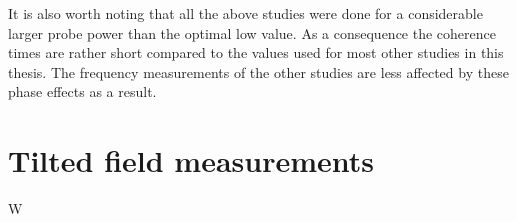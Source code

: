 It is also worth noting that all the above studies were done for a
considerable larger probe power than the optimal low value.  As a
consequence the coherence times are rather short compared to the
values used for most other studies in this thesis.  The frequency
measurements of the other studies are less affected by these phase
effects as a result.


\section{Tilted field measurements} 
\label{sec:tilted-results}


%


W%

